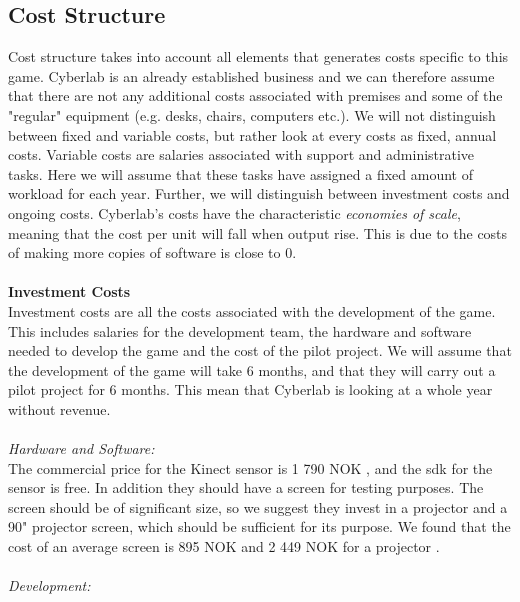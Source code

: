 \subsection{Cost Structure}
Cost structure takes into account all elements that generates costs specific to this game. Cyberlab is an already established business and we can therefore assume that there are not any additional costs associated with premises and some of the "regular" equipment (e.g. desks, chairs, computers etc.). We will not distinguish between fixed and variable costs, but rather look at every costs as fixed, annual costs. Variable costs are salaries associated with support and administrative tasks. Here we will assume that these tasks have assigned a fixed amount of workload for each year. Further, we will distinguish between investment costs and ongoing costs. Cyberlab's costs have the characteristic \emph{economies of scale}, meaning that the cost per unit will fall when output rise. This is due to the costs of making more copies of software is close to 0. \\ \\
\textbf{Investment Costs}\\
Investment costs are all the costs associated with the development of the game. This includes salaries for the development team, the hardware and software needed to develop the game and the cost of the pilot project. We will assume that the development of the game will take 6 months, and that they will carry out a pilot project for 6 months. This mean that Cyberlab is looking at a whole year without revenue.\\ \\
\emph{Hardware and Software:}\\
The commercial price for the Kinect sensor is 1 790 NOK \cite{pricekinect}, and the \ac{sdk} for the sensor is free. In addition they should have a screen for testing purposes. The screen should be of significant size, so we suggest they invest in a projector and a 90" projector screen, which should be sufficient for its purpose. We found that the cost of an average screen is 895 NOK and 2 449 NOK for a projector \cite{priceprojector}\cite{pricescreen}.\\ \\
\emph{Development:}\\
